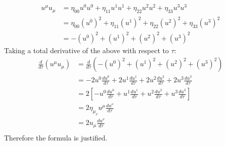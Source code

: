 \documentclass[9pt]{report}
\begin{document}
\begin{enumerate}
  \[
    \begin{align}
    u^\mu u_\mu &= \eta_{00} u^0 u^0 + \eta_{11} u^1 u^1 + \eta_{22} u^2 u^2 + \eta_{33} u^3 u^3\\
                &= \eta_{00} (u^0)^2 + \eta_{11} (u^1)^2 + \eta_{22} (u^2)^2 + \eta_{33} (u^3)^2 \\
                &= - (u^0)^2 + (u^1)^2 + (u^2)^2 + (u^3)^2
  \end{align}
  \]
  Taking a total derivative of the above with respect to $\tau$:
  \[
    \begin{align}
    \frac{d}{d\tau} (u^\mu u_\mu) &= \frac{d}{d\tau} (-(u^0)^2 + (u^1)^2 + (u^2)^2 + (u^3)^2) \\
                                  &= -2 u^0 \frac{du^0}{d\tau} + 2 u^1 \frac{du^1}{d\tau} + 2 u^2 \frac{du^2}{d\tau}+ 2 u^3 \frac{du^3}{d\tau}\\
                                  &= 2 [ -u^0 \frac{du^0}{d\tau} + u^1 \frac{du^1}{d\tau} + u^2 \frac{du^2}{d\tau}+ u^3 \frac{du^3}{d\tau} ] \\
                                  &= 2 \eta_\mu_\nu u^\mu \frac{du^\nu}{d\tau}\\
                                  &= 2 u_\mu \frac{du^\nu}{d\tau}\\
    \end{align}
  \]
  Therefore the formula is justified.
\end{enumerate}
\end{document}
